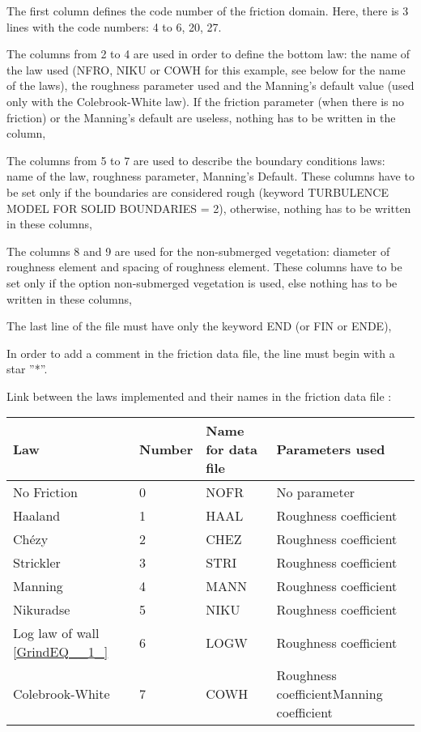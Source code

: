  The first column defines the code number of the friction domain. Here, there is 3 lines with the code numbers: 4 to 6, 20, 27.

 The columns from 2 to 4 are used in order to define the bottom law: the name of the law used (NFRO, NIKU or COWH for this example, see below for the name of the laws), the roughness parameter used and the Manning's default value (used only with the Colebrook-White law). If the friction parameter (when there is no friction) or the Manning's default are useless, nothing has to be written in the column,

 The columns from 5 to 7 are used to describe the boundary conditions laws: name of the law, roughness parameter, Manning's Default. These columns have to be set only if the boundaries are considered rough (keyword TURBULENCE MODEL FOR SOLID BOUNDARIES = 2), otherwise, nothing has to be written in these columns,

 The columns 8 and 9 are used for the non-submerged vegetation: diameter of roughness element and spacing of roughness element. These columns have to be set only if the option non-submerged vegetation is used, else nothing has to be written in these columns,

 The last line of the file must have only the keyword END (or FIN or ENDE),

 In order to add a comment in the friction data file, the line must begin with a star ''*''.





  Link between the laws implemented and their names in the friction data file :



\begin{tabular}{|p{1.0in}|p{0.4in}|p{0.8in}|p{1.0in}|} \hline
Law &  Number & Name for data file & Parameters used \\ \hline
No Friction & 0 & NOFR & No parameter \\ \hline
Haaland & 1 & HAAL & Roughness coefficient \\ \hline
Ch\'{e}zy & 2 & CHEZ & Roughness coefficient \\ \hline
Strickler & 3 & STRI & Roughness coefficient \\ \hline
Manning & 4 & MANN & Roughness coefficient \\ \hline
Nikuradse & 5 & NIKU & Roughness coefficient \\ \hline
Log law of wall \eqref{GrindEQ__1_} & 6 & LOGW & Roughness coefficient \\ \hline
Colebrook-White & 7 & COWH & Roughness coefficient\newline Manning coefficient \\ \hline
\end{tabular}

